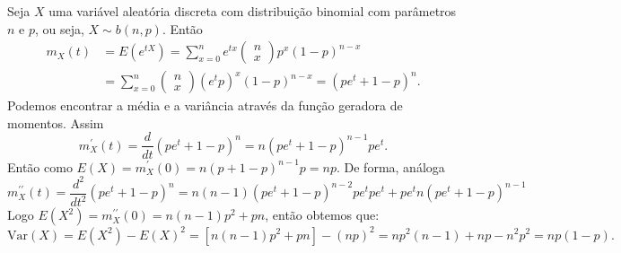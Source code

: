 \begin{frame}
	\begin{exem}
		Seja $ X $ uma variável aleatória discreta com distribuição binomial com parâmetros $ n $ e $ p $, ou seja, $ X\sim b(n,p) $. Então
		\[
		\begin{aligned}
		m_{X}(t)&={E}\left(e^{tX}\right)=\sum_{x=0}^{n}e^{tx}\left(\begin{array}{c}n\\x\end{array}\right)p^x(1-p)^{n-x} \\
		&=\sum_{x=0}^{n}\left(\begin{array}{c}n\\x\end{array}\right)(e^t p)^x(1-p)^{n-x}=(pe^t+1-p)^{n}.
		\end{aligned}
		\]	
		Podemos encontrar a média e a variância através da função geradora de momentos. Assim
		\[m^\prime_X(t)=\frac{d}{dt}(p e^t+ 1-p)^n=n(pe^t+1-p)^{n-1}pe^t.\]	
		Então como $ {E}(X)=m^\prime_X(0)=n(p+1-p)^{n-1}p=np $. De forma, análoga 
		\[m^{\prime\prime}_X(t)=\frac{d^2}{dt^2}(p e^t+ 1-p)^n=n(n-1)(pe^t+1-p)^{n-2}pe^t pe^t+pe^t n(pe^t+1-p)^{n-1}\]	
		Logo $ {E}\left(X^2\right)=m^{\prime\prime}_X(0)=n(n-1)p^2+ pn $, então obtemos que:
		\[\text{Var}(X)={E}(X^2)-{E}(X)^2=[n(n-1)p^2+pn] -(np)^2=np^2(n-1)+np-n^2p^2=np(1-p).\]	
		
		
		
	\end{exem}
\end{frame}


